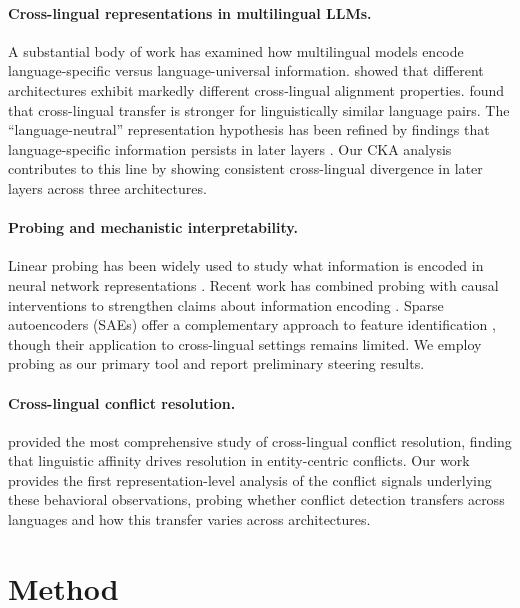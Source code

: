 \documentclass[11pt]{article}
\begin{document}
\paragraph{Cross-lingual representations in multilingual LLMs.}
A substantial body of work has examined how multilingual models encode language-specific versus language-universal information.
\citet{wendler2024llamas} showed that different architectures exhibit markedly different cross-lingual alignment properties.
\citet{muller2021first} found that cross-lingual transfer is stronger for linguistically similar language pairs.
The ``language-neutral'' representation hypothesis \citep{pires2019multilingual,wu2019beto} has been refined by findings that language-specific information persists in later layers \citep{libovicky2020language,gonen2020simple}.
Our CKA analysis contributes to this line by showing consistent cross-lingual divergence in later layers across three architectures.

\paragraph{Probing and mechanistic interpretability.}
Linear probing has been widely used to study what information is encoded in neural network representations \citep{belinkov2022probing,hewitt2019structural}.
Recent work has combined probing with causal interventions to strengthen claims about information encoding \citep{geiger2021causal,elazar2021amnesic}.
Sparse autoencoders (SAEs) offer a complementary approach to feature identification \citep{cunningham2023sparse,bricken2023monosemanticity}, though their application to cross-lingual settings remains limited.
We employ probing as our primary tool and report preliminary steering results.

\paragraph{Cross-lingual conflict resolution.}
\citet{zhao2026clear} provided the most comprehensive study of cross-lingual conflict resolution, finding that linguistic affinity drives resolution in entity-centric conflicts.
Our work provides the first representation-level analysis of the conflict signals underlying these behavioral observations, probing whether conflict detection transfers across languages and how this transfer varies across architectures.

\section{Method}
\end{document}
